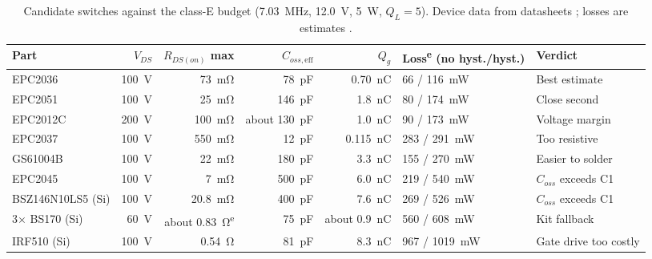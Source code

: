 \documentclass[11pt,letterpaper]{article}
\newcommand{\est}{\textsuperscript{e}}
\begin{document}
\begin{table}[h]
\centering\footnotesize\setlength{\tabcolsep}{2.6pt}
\caption{Candidate switches against the class-E budget (\SI{7.03}{\mega\hertz}, \SI{12.0}{\volt}, \SI{5}{\watt}, $Q_L=5$). Device data from datasheets \cite{epc2036ds,epcothers,otherdevices}; losses are estimates \cite{projnotes}.}\label{tab:devices}
\begin{tabular}{@{}lrrrrll@{}}
\toprule
Part & $V_{DS}$ & $R_{DS(on)}$ max & $C_{oss,\mathrm{eff}}$ & $Q_g$ & Loss\est{} (no hyst./hyst.) & Verdict \\ \midrule
EPC2036 & \SI{100}{\volt} & \SI{73}{\milli\ohm} & \SI{78}{\pico\farad} & \SI{0.70}{\nano\coulomb} & 66 / \SI{116}{\milli\watt} & Best estimate \\
EPC2051 & \SI{100}{\volt} & \SI{25}{\milli\ohm} & \SI{146}{\pico\farad} & \SI{1.8}{\nano\coulomb} & 80 / \SI{174}{\milli\watt} & Close second \\
EPC2012C & \SI{200}{\volt} & \SI{100}{\milli\ohm} & about \SI{130}{\pico\farad} & \SI{1.0}{\nano\coulomb} & 90 / \SI{173}{\milli\watt} & Voltage margin \\
EPC2037 & \SI{100}{\volt} & \SI{550}{\milli\ohm} & \SI{12}{\pico\farad} & \SI{0.115}{\nano\coulomb} & 283 / \SI{291}{\milli\watt} & Too resistive \\
GS61004B & \SI{100}{\volt} & \SI{22}{\milli\ohm} & \SI{180}{\pico\farad} & \SI{3.3}{\nano\coulomb} & 155 / \SI{270}{\milli\watt} & Easier to solder \\
EPC2045 & \SI{100}{\volt} & \SI{7}{\milli\ohm} & \SI{500}{\pico\farad} & \SI{6.0}{\nano\coulomb} & 219 / \SI{540}{\milli\watt} & $C_{oss}$ exceeds C1 \\
BSZ146N10LS5 (Si) & \SI{100}{\volt} & \SI{20.8}{\milli\ohm} & \SI{400}{\pico\farad} & \SI{7.6}{\nano\coulomb} & 269 / \SI{526}{\milli\watt} & $C_{oss}$ exceeds C1 \\
3$\times$ BS170 (Si) & \SI{60}{\volt} & about \SI{0.83}{\ohm}\est & \SI{75}{\pico\farad} & about \SI{0.9}{\nano\coulomb} & 560 / \SI{608}{\milli\watt} & Kit fallback \\
IRF510 (Si) & \SI{100}{\volt} & \SI{0.54}{\ohm} & \SI{81}{\pico\farad} & \SI{8.3}{\nano\coulomb} & 967 / \SI{1019}{\milli\watt} & Gate drive too costly \\
\bottomrule
\end{tabular}
\end{table}
\end{document}
